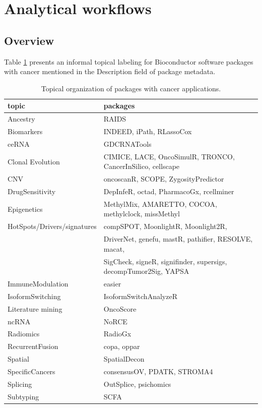 
\section{Analytical workflows}\label{analytical-workflows}


\subsection{Overview}\label{overview}

Table \ref{tab:tab-wflow} presents an informal topical
labeling for Bioconductor software packages with
cancer mentioned in the Description field of package
metadata.

\begin{table}
\caption{\label{tab:tab-wflow}Topical organization of packages with cancer applications.}
\begin{tabular}{l{4cm}p{6cm}}
\toprule
topic & packages\\
\midrule
Ancestry & RAIDS\\
Biomarkers & INDEED, iPath, RLassoCox\\
ceRNA & GDCRNATools\\
Clonal Evolution & CIMICE, LACE, OncoSimulR, TRONCO, CancerInSilico, cellscape\\
CNV & oncoscanR, SCOPE, ZygosityPredictor\\
\addlinespace
DrugSensitivity & DepInfeR, octad, PharmacoGx, rcellminer\\
Epigenetics & MethylMix, AMARETTO, COCOA, methylclock, missMethyl\\
HotSpots/Drivers/signatures & compSPOT, MoonlightR, Moonlight2R, \\
 & DriverNet, genefu, mastR, pathifier, RESOLVE, macat, \\
 & SigCheck, signeR, signifinder, supersigs, decompTumor2Sig, YAPSA\\
ImmuneModulation & easier\\
IsoformSwitching & IsoformSwitchAnalyzeR\\
\addlinespace
Literature mining & OncoScore\\
ncRNA & NoRCE\\
Radiomics & RadioGx\\
RecurrentFusion & copa, oppar\\
Spatial & SpatialDecon\\
\addlinespace
SpecificCancers & consensusOV, PDATK, STROMA4\\
Splicing & OutSplice, psichomics\\
Subtyping & SCFA\\
\end{tabular}
\bottomrule
\end{table}

